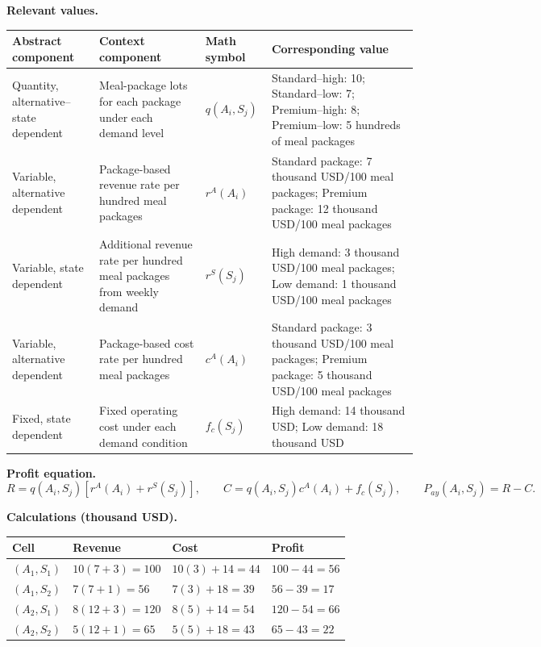 {		\textbf{Relevant values.}
		\begin{center}
			\small
			\begin{tabularx}{\textwidth}{
					>{\raggedright\arraybackslash}X
					>{\raggedright\arraybackslash}X
					>{\centering\arraybackslash}p{}
					>{\raggedright\arraybackslash}X
				}
				\toprule
				Abstract component & Context component & Math symbol & Corresponding value \\
				\midrule
				Quantity, alternative--state dependent
				& Meal-package lots for each package under each demand level
				& $q(A_i,S_j)$
				& Standard--high: 10; Standard--low: 7; Premium--high: 8; Premium--low: 5 hundreds of meal packages \\
				Variable, alternative dependent
				& Package-based revenue rate per hundred meal packages
				& $r^A(A_i)$
				& Standard package: 7 thousand USD/100 meal packages; Premium package: 12 thousand USD/100 meal packages \\
				Variable, state dependent
				& Additional revenue rate per hundred meal packages from weekly demand
				& $r^S(S_j)$
				& High demand: 3 thousand USD/100 meal packages; Low demand: 1 thousand USD/100 meal packages \\
				Variable, alternative dependent
				& Package-based cost rate per hundred meal packages
				& $c^A(A_i)$
				& Standard package: 3 thousand USD/100 meal packages; Premium package: 5 thousand USD/100 meal packages \\
				Fixed, state dependent
				& Fixed operating cost under each demand condition
				& $f_c(S_j)$
				& High demand: 14 thousand USD; Low demand: 18 thousand USD \\
				\bottomrule
			\end{tabularx}
		\end{center}
		
		\textbf{Profit equation.}
		\[
		R=q(A_i,S_j)\left[r^A(A_i)+r^S(S_j)\right],
		\qquad
		C=q(A_i,S_j)c^A(A_i)+f_c(S_j),
		\qquad
		P_{ay}(A_i,S_j)=R-C.
		\]
		
		\textbf{Calculations (thousand USD).}
		\begin{center}
			\small
			\begin{tabularx}{\textwidth}{
					>{\raggedright\arraybackslash}X
					>{\centering\arraybackslash}X
					>{\centering\arraybackslash}X
					>{\centering\arraybackslash}X
				}
				\toprule
				Cell & Revenue & Cost & Profit \\
				\midrule
				$(A_1,S_1)$ & $10(7+3)=100$ & $10(3)+14=44$ & $100-44=56$ \\
				$(A_1,S_2)$ & $7(7+1)=56$ & $7(3)+18=39$ & $56-39=17$ \\
				$(A_2,S_1)$ & $8(12+3)=120$ & $8(5)+14=54$ & $120-54=66$ \\
				$(A_2,S_2)$ & $5(12+1)=65$ & $5(5)+18=43$ & $65-43=22$ \\
				\bottomrule
			\end{tabularx}
		\end{center}
		
}
